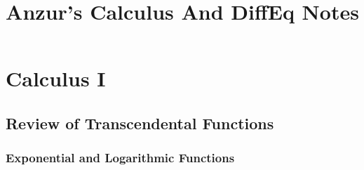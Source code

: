 \documentclass[letterpaper, 11pt, openany]{book}
\title{Anzur's Calculus And DiffEq Notes}
\theoremstyle{mytheoremstyle}
\theoremstyle{myexamplestyle}
\begin{document}
\frontmatter


\begin{center}
    {\sffamily\huge{}\selectfont \MyTitle}
\end{center}

\pagestyle{empty}

\makeatletter
{}
\makeatother

\newpage

\mainmatter

\pagestyle{fancy}


\part{Calculus I}
\thispagestyle{firstofchapter}
\chapter{Review of Transcendental Functions}
\section{Exponential and Logarithmic Functions}
\setcounter{figure}{0}
\end{document}
